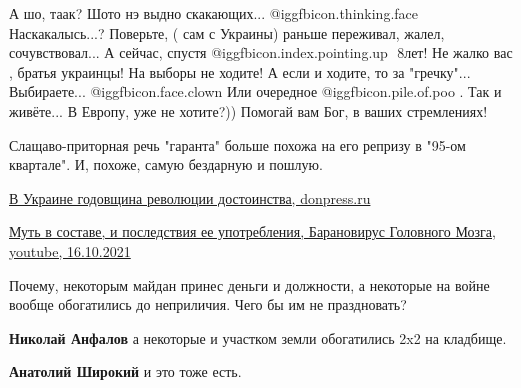 \begin{itemize}

\obeycr
А шо, таак?
Шото нэ выдно скакающих... @igg{fbicon.thinking.face} 
Наскакалысь...?
Поверьте, ( сам с Украины) раньше переживал, жалел, сочувствовал... А сейчас, спустя @igg{fbicon.index.pointing.up} ️ 8лет! Не жалко вас , братья украинцы!
На выборы не ходите! А если и ходите, то за "гречку"... Выбираете... @igg{fbicon.face.clown}  Или очередное  @igg{fbicon.pile.of.poo} .
Так и живёте... В Европу, уже не хотите?))
Помогай вам Бог, в ваших стремлениях!
\restorecr


Слащаво-приторная речь "гаранта" больше похожа на его репризу в "95-ом
квартале". И, похоже, самую бездарную и пошлую.


\href{https://donpress.ru/v-ukraine-godovshhina-revoljucii-dostoinstva}{%
В Украине годовщина революции достоинства, donpress.ru%
}


\href{https://www.youtube.com/watch?v=VMCVY52yi68}{%
Муть в составе, и последствия ее употребления, Барановирус Головного Мозга, youtube, 16.10.2021%
}


Почему, некоторым майдан принес деньги и должности, а некоторые на войне вообще
обогатились до неприличия. Чего бы им не праздновать?

\begin{itemize} %
\textbf{Николай Анфалов} а некоторые и участком земли обогатились 2x2 на кладбище.

\textbf{Анатолий Широкий} и это тоже есть.
\end{itemize} %



\end{itemize} %
